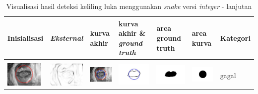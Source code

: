 \begin{table}[H]
	\centering
	\caption{Visualisasi hasil deteksi keliling luka menggunakan \emph{snake} versi \emph{integer} - lanjutan}
	\label{tabel_hasil_45}
	\begin{tabular}{|m{0.7in}|m{0.7in}|m{0.7in}|m{0.7in}|m{0.7in}|m{0.7in}|m{0.7in}|}
		\hline
		\textbf{Inisialisasi} & \textbf{\emph{Eksternal}} & \textbf{kurva akhir} & \textbf{kurva akhir \& \emph{ground truth}}& \textbf{area ground truth} & \textbf{area kurva} & \textbf{Kategori} \\
		\hline
		
		&  &  & & & &  \\
		\includegraphics[width=0.7in]{dataset/dataset_3/luka_kuning/ready/12_integer_init.jpg}&
		\includegraphics[width=0.7in]{dataset/dataset_3/luka_kuning/ready/12_integer_ext.jpg}&
		\includegraphics[width=0.7in]{dataset/dataset_3/luka_kuning/ready/12_integer_result.jpg}&
		\includegraphics[width=0.7in]{dataset/dataset_3/luka_kuning/ready/12_gt_r_integer.jpg}&
		\includegraphics[width=0.7in]{dataset/dataset_3/luka_kuning/ready/12_r.jpg}&
		\includegraphics[width=0.7in]{dataset/dataset_3/luka_kuning/ready/12_integer_r.jpg}&
		gagal\\
		\hline
		
	\end{tabular}
\end{table}

